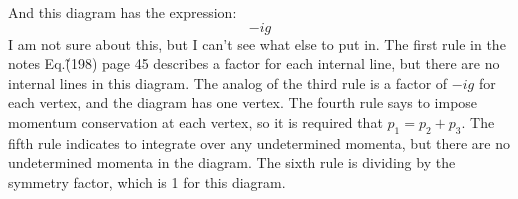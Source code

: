 \documentclass[12pt,a4]{article}
\begin{document}
\begin{enumerate}
\begin{enumerate}
\begin{enumerate}
              And this diagram has the expression:
              \begin{equation*}
                -ig
              \end{equation*}
              I am not sure about this, but I can't see what else to put in. The first rule in the notes Eq.\~(198) page 45 describes a factor for each internal line, but there are no internal lines in this diagram.
              The analog of the third rule is a factor of $-ig$ for each vertex, and the diagram has one vertex.
              The fourth rule says to impose momentum conservation at each vertex, so it is required that $p_1 = p_2 + p_3$.
              The fifth rule indicates to integrate over any undetermined momenta, but there are no undetermined momenta in the diagram.
              The sixth rule is dividing by the symmetry factor, which is 1 for this diagram.


\end{enumerate}
\end{enumerate}
\end{enumerate}
\end{document}
